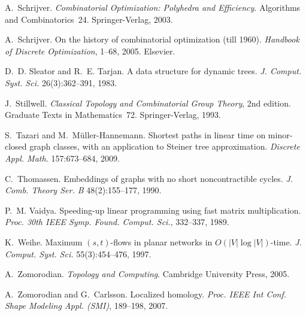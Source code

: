 \documentclass{sig-alternate}
\begin{document}
\begin{thebibliography}{10}
A.~Schrijver.
\newblock \emph{Combinatorial Optimization: Polyhedra and Efficiency}.
\newblock Algorithms and Combinatorics~24. Springer-Verlag, 2003.

A.~Schrijver.
\newblock On the history of combinatorial optimization (till 1960).
\newblock \emph{Handbook of Discrete Optimization}, 1--68, 2005. Elsevier.

D.~D. Sleator and R.~E. Tarjan.
\newblock A data structure for dynamic trees.
\newblock \emph{J. Comput. Syst. Sci.} 26(3):362--391, 1983.

J.~Stillwell.
\newblock \emph{Classical Topology and Combinatorial Group Theory}, 2nd
  edition.
\newblock Graduate Texts in Mathematics~72. Springer-Verlag, 1993.

S.~Tazari and M.~M{\"u}ller-Hannemann.
\newblock Shortest paths in linear time on minor-closed graph classes, with an
  application to {Steiner} tree approximation.
\newblock \emph{Discrete Appl. Math.} 157:673--684, 2009.

C.~Thomassen.
\newblock Embeddings of graphs with no short noncontractible cycles.
\newblock \emph{J. Comb. Theory Ser. B} 48(2):155--177, 1990.

P.~M. Vaidya.
\newblock Speeding-up linear programming using fast matrix multiplication.
\newblock \emph{Proc. 30th IEEE Symp. Found. Comput. Sci.}, 332--337, 1989.

K.~Weihe.
\newblock Maximum $(s, t)$-flows in planar networks in {$O(|V|\log|V|)$}-time.
\newblock \emph{J. Comput. Syst. Sci.} 55(3):454--476, 1997.

A.~Zomorodian.
\newblock \emph{Topology and Computing}.
\newblock Cambridge University Press, 2005.

A.~Zomorodian and G.~Carlsson.
\newblock Localized homology.
\newblock \emph{Proc. IEEE Int Conf. Shape Modeling Appl. (SMI)}, 189--198,
  2007.

\end{thebibliography}
\end{document}
